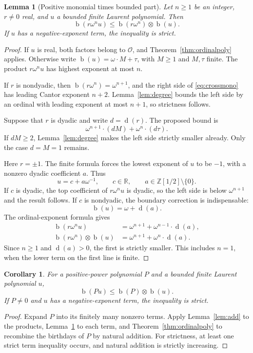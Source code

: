 \documentclass[11pt,letterpaper]{article}
\numberwithin{equation}{section}
\newtheorem{lemma}[theorem]{Lemma}
\newtheorem{corollary}[theorem]{Corollary}
\theoremstyle{definition}
\theoremstyle{remark}
\newcommand{\R}{\mathbb{R}}
\newcommand{\D}{\mathbb{Z}[1/2]}
\newcommand{\OrdPoly}{\mathcal{O}}
\newcommand{\bd}{\operatorname{b}}
\newcommand{\rd}{\operatorname{d}}
\newcommand{\np}{\mathbin{\otimes}}
\begin{document}
\begin{lemma}[Positive monomial times bounded part]\label{lem:crossmono}
Let $n\geq1$ be an integer, $r\neq0$ real, and $u$ a bounded finite Laurent
polynomial. Then
\begin{equation}\label{eq:crossmono}
 \bd(r\omega^n u)\leq
       \bd(r\omega^n)\np\bd(u).
\end{equation}
If $u$ has a negative-exponent term, the inequality is strict.
\end{lemma}
\begin{proof}
If $u$ is real, both factors belong to $\OrdPoly$, and
Theorem~\ref{thm:ordinalpoly} applies. Otherwise write
$\bd(u)=\omega\cdot M+\tau$, with $M\geq1$ and $M,\tau$ finite.
The product $r\omega^n u$ has highest exponent at most $n$.

If $r$ is nondyadic, then $\bd(r\omega^n)=\omega^{n+1}$, and the right side
of \eqref{eq:crossmono} has leading Cantor exponent $n+2$. Lemma~\ref{lem:degree}
bounds the left side by an ordinal with leading exponent at most $n+1$, so
strictness follows.

Suppose that $r$ is dyadic and write $d=\rd(r)$. The proposed bound is
\begin{equation}\label{eq:crossbudget}
 \omega^{n+1}\cdot(dM)+\omega^n\cdot(d\tau).
\end{equation}
If $dM\geq2$, Lemma~\ref{lem:degree} makes the left side strictly smaller
already. Only the case $d=M=1$ remains.

Here $r=\pm1$. The finite formula forces the lowest exponent of $u$ to be
$-1$, with a nonzero dyadic coefficient $a$. Thus
\[
 u=c+a\omega^{-1},\qquad c\in\R,
 \qquad a\in\D\setminus\{0\}.
\]
If $c$ is dyadic, the top coefficient of $r\omega^n u$ is dyadic, so the
left side is below $\omega^{n+1}$ and the result follows. If $c$ is
nondyadic, the boundary correction is indispensable:
\[
 \bd(u)=\omega+\rd(a).
\]
The ordinal-exponent formula gives
\begin{align*}
 \bd(r\omega^n u)
   &=\omega^{n+1}+\omega^{n-1}\cdot\rd(a),\\
 \bd(r\omega^n)\np\bd(u)
   &=\omega^{n+1}+\omega^n\cdot\rd(a).
\end{align*}
Since $n\geq1$ and $\rd(a)>0$, the first is strictly smaller. This includes
$n=1$, when the lower term on the first line is finite.
\end{proof}

\begin{corollary}\label{cor:crosspoly}
For a positive-power polynomial $P$ and a bounded finite Laurent polynomial
$u$,
\[
 \bd(Pu)\leq\bd(P)\np\bd(u).
\]
If $P\neq0$ and $u$ has a negative-exponent term, the inequality is strict.
\end{corollary}
\begin{proof}
Expand $P$ into its finitely many nonzero terms. Apply
Lemma~\ref{lem:add} to the products, Lemma~\ref{lem:crossmono} to each term,
and Theorem~\ref{thm:ordinalpoly} to recombine the birthdays of $P$ by natural
addition. For strictness, at least one strict term inequality occurs, and
natural addition is strictly increasing.
\end{proof}
\end{document}
